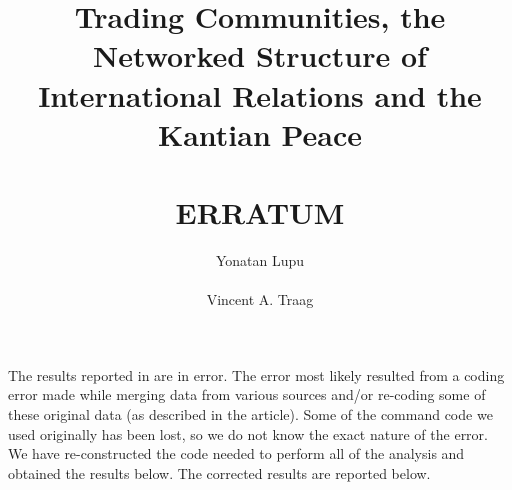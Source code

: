 \documentclass[11pt,fleqn]{article}
\begin{document}
\newcommand{\fn}[1]{\footnote{\raggedright #1}}
\renewcommand{\thefootnote}{\fnsymbol{footnote} }
\setlength{\footnotesep}{13pt}

\makeatletter
\def\s@btitle{\relax}
\def\subtitle#1{\gdef\s@btitle{#1}}
\def\@maketitle{%
  \null
  \vskip 2em%
  \begin{center}%
  \let \footnote \thanks
    {\LARGE \@title \par}%
                \if\s@btitle\relax
                \else\typeout{[subtitle]}%
                        \vskip .5pc
                        \begin{large}%
                                \bf \emph \textsl{\s@btitle}%
                                \par
                        \end{large}%
                \fi
    \vskip 1.5em%
    {\large
      \lineskip .5em%
      \begin{tabular}[t]{c}%
        \@author
      \end{tabular}\par}%
    \vskip 1em%
    {\@date}%
  \end{center}%
  \par
  \vskip 1.5em}
\makeatother



\title{\textbf{Trading Communities, the Networked Structure of International Relations and the Kantian Peace}\\
\ \\
 \textbf{ERRATUM}\\}

\author{Yonatan Lupu\\
\\
Vincent A. Traag\\}


\rmfamily \raggedright \allowdisplaybreaks
\setlength{\parindent}{.5in}
\setlength{\bibhang}{.5in}
\maketitle

\renewcommand{\thefootnote}{\arabic{footnote} }

\doublespacing

The results reported in \citet{lupu2013trading} are in error.  The error most likely resulted from a coding error made while merging data from various sources and/or re-coding some of these original data (as described in the article).  Some of the command code we used originally has been lost, so we do not know the exact nature of the error.  We have re-constructed the code needed to perform all of the analysis and obtained the results below.  The corrected results are reported below.
\end{document}
